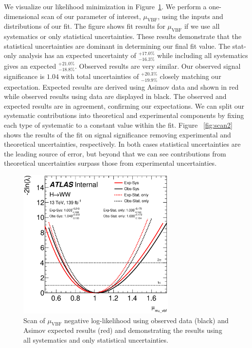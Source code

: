 We visualize our likelihood minimization in Figure~\ref{fig:scan}. We perform a one-dimensional scan of our parameter of interest, $\mu_{\text{VBF}}$, using the inputs and distributions of our fit. The figure shows fit results for $\mu_{\text{VBF}}$ if we use all systematics or only statistical uncertainties. These results demonstrate that the statistical uncertainties are dominant in determining our final fit value. The stat-only analysis has an expected uncertainty of $^{+17.0\%}_{-16.3\%}$ while including all systematics gives an expected $^{+21.0\%}_{-18.8\%}$. Observed results are very similar. Our observed signal significance is $1.04$ with total uncertainties of $^{+20.3\%}_{-19.9\%}$ closely matching our expectation. Expected results are derived using Asimov data and shown in red while observed results using data are displayed in black. The observed and expected results are in agreement, confirming our expectations. We can split our systematic contributions into theoretical and experimental components by fixing each type of systematic to a constant value within the fit. Figure ~\ref{fig:scan2} shows the results of the fit on signal significance removing experimental and theoretical uncertainties, respectively. In both cases statistical uncertainties are the leading source of error, but beyond that we can see contributions from theoretical uncertainties surpass those from experimental uncertainties.  

\begin{figure}[!h]
\centering
\includegraphics[width=0.7\textwidth]{Pictures/fitresults/mu_vbf_stattotal.eps}
\caption{Scan of $\mu_{\text{VBF}}$ negative log-likelihood using observed data (black) and Asimov expected results (red) and demonstrating the results using all systematics and only statistical uncertainties.}
\label{fig:scan}
\end{figure}

